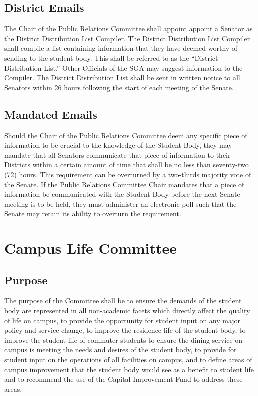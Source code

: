 \documentclass[12pt]{scrreprt}
\begin{document}
\subsection{District Emails}
The Chair of the Public Relations Committee shall appoint appoint a Senator as the District Distribution List Compiler. The District Distribution List Compiler shall compile a list  containing information that they have deemed worthy of sending to the student body. This shall be referred to as the “District Distribution List.” Other
Officials of the SGA may suggest information to the Compiler. The District Distribution List shall be sent
in written notice to all Senators within 26 hours following the start of each meeting of the Senate.

\subsection{Mandated Emails}
Should the Chair of the Public Relations Committee deem any specific piece of information to be crucial to the knowledge of the Student Body, they may mandate that all Senators communicate that piece of information to their Districts within a certain amount of time that shall be no less than seventy-two (72) hours. This requirement can be overturned by a two-thirds majority vote of the Senate. If the Public Relations Committee Chair mandates that a piece of information be communicated with the Student Body before the next Senate meeting is to be held, they must administer an electronic poll such that the Senate may retain its ability to overturn the requirement.



\section{Campus Life Committee}

\subsection{Purpose}
The purpose of the Committee shall be to ensure the demands of the student 
body are represented in all non-academic facets which directly affect the 
quality of life on campus, to provide the opportunity for student input on any 
major policy and service change, to improve the residence life of the student 
body, to improve the student life of commuter students to ensure the dining 
service on campus is meeting the needs and desires of the student body, to 
provide for student input on the operations of all facilities on campus, and 
to define areas of campus improvement that the student body would see as a 
benefit to student life and to recommend the use of the Capital Improvement 
Fund to address these areas.
\end{document}
